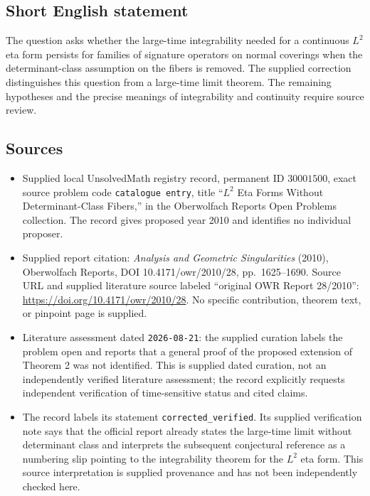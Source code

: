 \documentclass[11pt]{article}
\begin{document}
\subsection{Short English statement}
The question asks whether the large-time integrability needed for a continuous \(L^2\) eta form persists for families of signature operators on normal coverings when the determinant-class assumption on the fibers is removed. The supplied correction distinguishes this question from a large-time limit theorem. The remaining hypotheses and the precise meanings of integrability and continuity require source review.
\subsection{Sources}
\begin{itemize}
\item Supplied local UnsolvedMath registry record, permanent ID \(30001500\), exact source problem code \texttt{catalogue entry}, title ``\(L^2\) Eta Forms Without Determinant-Class Fibers,'' in the Oberwolfach Reports Open Problems collection. The record gives proposed year 2010 and identifies no individual proposer.
\item Supplied report citation: \emph{Analysis and Geometric Singularities} (2010), Oberwolfach Reports, DOI 10.4171/owr/2010/28, pp.\ 1625--1690. Source URL and supplied literature source labeled ``original OWR Report 28/2010'': \url{https://doi.org/10.4171/owr/2010/28}. No specific contribution, theorem text, or pinpoint page is supplied.
\item Literature assessment dated \texttt{2026-08-21}: the supplied curation labels the problem open and reports that a general proof of the proposed extension of Theorem 2 was not identified. This is supplied dated curation, not an independently verified literature assessment; the record explicitly requests independent verification of time-sensitive status and cited claims.
\item The record labels its statement \texttt{corrected\_verified}. Its supplied verification note says that the official report already states the large-time limit without determinant class and interprets the subsequent conjectural reference as a numbering slip pointing to the integrability theorem for the \(L^2\) eta form. This source interpretation is supplied provenance and has not been independently checked here.
\end{itemize}
\end{document}
